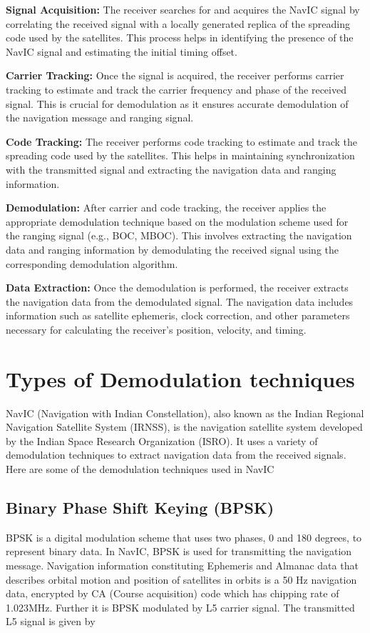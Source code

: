 \documentclass[onecolumn]{article}
\begin{document}
\begin{enumerate}
\begin{Large}
\textbf{Signal Acquisition:} The receiver searches for and acquires the NavIC signal by correlating the received signal with a locally generated replica of the spreading code used by the satellites. This process helps in identifying the presence of the NavIC signal and estimating the initial timing offset.

\textbf{Carrier Tracking:} Once the signal is acquired, the receiver performs carrier tracking to estimate and track the carrier frequency and phase of the received signal. This is crucial for demodulation as it ensures accurate demodulation of the navigation message and ranging signal.

\textbf{Code Tracking:} The receiver performs code tracking to estimate and track the spreading code used by the satellites. This helps in maintaining synchronization with the transmitted signal and extracting the navigation data and ranging information.

\textbf{Demodulation:} After carrier and code tracking, the receiver applies the appropriate demodulation technique based on the modulation scheme used for the ranging signal (e.g., BOC, MBOC). This involves extracting the navigation data and ranging information by demodulating the received signal using the corresponding demodulation algorithm.

\textbf{Data Extraction:} Once the demodulation is performed, the receiver extracts the navigation data from the demodulated signal. The navigation data includes information such as satellite ephemeris, clock correction, and other parameters necessary for calculating the receiver's position, velocity, and timing.

\section{Types of Demodulation techniques}
NavIC (Navigation with Indian Constellation), also known as the Indian Regional Navigation Satellite System (IRNSS), is the navigation satellite system developed by the Indian Space Research Organization (ISRO). It uses a variety of demodulation techniques to extract navigation data from the received signals. 
Here are some of the demodulation techniques used in NavIC
\subsection{Binary Phase Shift Keying (BPSK)}
BPSK is a digital modulation scheme that uses two phases, 0 and 180 degrees, to represent binary data. In NavIC, BPSK is used for transmitting the navigation message.
Navigation information constituting Ephemeris and Almanac
data that describes orbital motion and position of satellites in
orbits is a 50 Hz navigation data, encrypted by CA (Course
acquisition) code which has chipping rate of 1.023MHz.
Further it is BPSK modulated by L5 carrier signal. The
transmitted L5 signal is given by 


\end{Large}
\end{enumerate}
\end{document}
